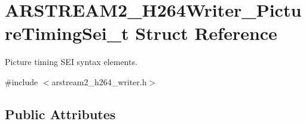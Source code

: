 \hypertarget{struct_a_r_s_t_r_e_a_m2___h264_writer___picture_timing_sei__t}{}\section{A\+R\+S\+T\+R\+E\+A\+M2\+\_\+\+H264\+Writer\+\_\+\+Picture\+Timing\+Sei\+\_\+t Struct Reference}
\label{struct_a_r_s_t_r_e_a_m2___h264_writer___picture_timing_sei__t}


Picture timing S\+EI syntax elements.  




{\ttfamily \#include $<$arstream2\+\_\+h264\+\_\+writer.\+h$>$}

\subsection*{Public Attributes}
